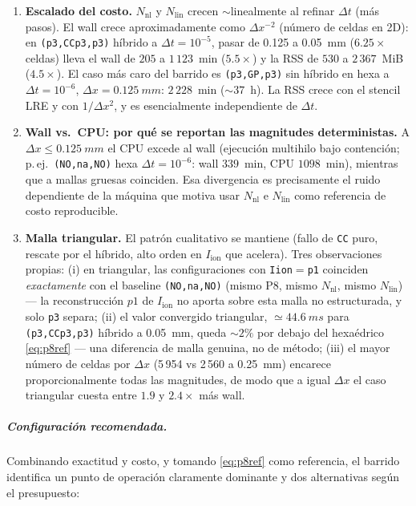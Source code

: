 \documentclass[11pt,a4paper]{article}
\newcommand{\code}[1]{\texttt{\small #1}}
\newcommand{\Iion}{I_{\mathrm{ion}}}
\begin{document}
\begin{enumerate}[topsep=3pt,itemsep=3pt,leftmargin=1.5em]
        la \emph{corrección} de \code{GP} con buena parte del \emph{ahorro} de
        \code{CC}.
  \item \textbf{Escalado del costo.} $N_{\mathrm{nl}}$ y $N_{\mathrm{lin}}$ crecen
        $\sim$linealmente al refinar $\Delta t$ (más pasos). El wall crece
        aproximadamente como $\Delta x^{-2}$ (número de celdas en 2D): en
        \code{(p3,CCp3,p3)} híbrido a $\Delta t=10^{-5}$, pasar de \SI{0.125}{} a
        \SI{0.05}{mm} ($6.25\times$ celdas) lleva el wall de $205$ a $1\,123$~min
        ($5.5\times$) y la RSS de $530$ a $2\,367$~MiB ($4.5\times$). El caso más caro
        del barrido es \code{(p3,GP,p3)} sin híbrido en hexa a $\Delta t=10^{-6}$,
        $\Delta x=\SI{0.125}{mm}$: $2\,228$~min ($\sim 37$~h). La RSS crece con el
        stencil LRE y con $1/\Delta x^2$, y es esencialmente independiente de
        $\Delta t$.
  \item \textbf{Wall vs.\ CPU: por qué se reportan las magnitudes deterministas.} A
        $\Delta x\le\SI{0.125}{mm}$ el CPU excede al wall (ejecución multihilo bajo
        contención; p.\,ej.\ \code{(NO,na,NO)} hexa $\Delta t=10^{-6}$: wall
        $339$~min, CPU $1098$~min), mientras que a mallas gruesas coinciden. Esa
        divergencia es precisamente el ruido dependiente de la máquina que motiva usar
        $N_{\mathrm{nl}}$ e $N_{\mathrm{lin}}$ como referencia de costo reproducible.
  \item \textbf{Malla triangular.} El patrón cualitativo se mantiene (fallo de
        \code{CC} puro, rescate por el híbrido, alto orden en $\Iion$ que acelera).
        Tres observaciones propias: (i) en triangular, las configuraciones con
        \code{Iion}$=$\code{p1} coinciden \emph{exactamente} con el baseline
        \code{(NO,na,NO)} (mismo P8, mismo $N_{\mathrm{nl}}$, mismo
        $N_{\mathrm{lin}}$) --- la reconstrucción $p1$ de $\Iion$ no aporta sobre esta
        malla no estructurada, y solo \code{p3} separa; (ii) el valor convergido
        triangular, $\simeq\SI{44.6}{ms}$ para \code{(p3,CCp3,p3)} híbrido a
        \SI{0.05}{mm}, queda $\sim 2\%$ por debajo del hexaédrico
        \eqref{eq:p8ref} --- una diferencia de malla genuina, no de método; (iii) el
        mayor número de celdas por $\Delta x$ (5\,954 vs 2\,560 a \SI{0.25}{mm})
        encarece proporcionalmente todas las magnitudes, de modo que a igual
        $\Delta x$ el caso triangular cuesta entre $1.9$ y $2.4\times$ más wall.
\end{enumerate}

\subparagraph{Configuración recomendada.}
\label{sec:res2d:reco}
Combinando exactitud y costo, y tomando \eqref{eq:p8ref} como referencia, el barrido
identifica un punto de operación claramente dominante y dos alternativas según el
presupuesto:
\end{document}
